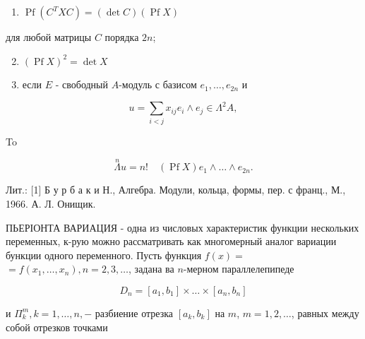 \documentclass[10pt]{article}
\begin{document}
\begin{enumerate}

  \item $\operatorname{Pf}\left(C^{T} X C\right)=(\operatorname{det} C)(\operatorname{Pf} X)$

\end{enumerate}



для любой матрицы $C$ порядка $2 n$;



\begin{enumerate}

  \setcounter{enumi}{1}

  \item $(\operatorname{Pf} X)^{2}=\operatorname{det} X$



  \item если $E$ - свободный $A$-модуль с базисом $e_{1}, \ldots, e_{2 n}$ и



\end{enumerate}



\[

u=\sum_{i<j} x_{i j} e_{i} \wedge e_{j} \in \Lambda^{2} A,

\]



To



\[

\stackrel{n}{\Lambda} u=n ! \quad(\operatorname{Pf} X) e_{1} \wedge \ldots \wedge e_{2 n} .

\]



Лит.: [1] Б у р б а к и Н., Алгебра. Модули, кольца, формы, пер. с франц., М., 1966. А. Л. Онищик.



ПЬЕРІОНТА ВАРИАЦИЯ - одна из числовых характеристик функции нескольких переменных, к-рую можно рассматривать как многомерный аналог вариации бункции одного переменного. Пусть функция $f(x)=$ $=f\left(x_{1}, \ldots, x_{n}\right), n=2,3, \ldots$, задана ва $n$-мерном параллелепипеде



\[

D_{n}=\left[a_{1}, b_{1}\right] \times \ldots \times\left[a_{n}, b_{n}\right]

\]



и $\Pi_{k}^{m}, k=1, \ldots, n,-$ разбиение отрезка $\left[a_{k}, b_{k}\right]$ на $m$, $m=1,2, \ldots$, равных между собой отрезков точками
\end{document}
